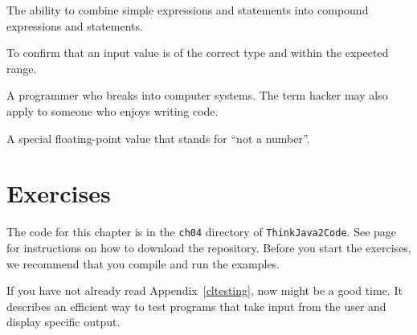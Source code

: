 \begin{description}
The ability to combine simple expressions and statements into compound expressions and statements.

To confirm that an input value is of the correct type and within the expected range.

A programmer who breaks into computer systems.
The term hacker may also apply to someone who enjoys writing code.

A special floating-point value that stands for ``not a number''.

\end{description}


\section{Exercises}

The code for this chapter is in the {\tt ch04} directory of {\tt ThinkJava2Code}.
See page~\pageref{code} for instructions on how to download the repository.
Before you start the exercises, we recommend that you compile and run the examples.

If you have not already read Appendix~\ref{cltesting}, now might be a good time.
It describes an efficient way to test programs that take input from the user and display specific output.


